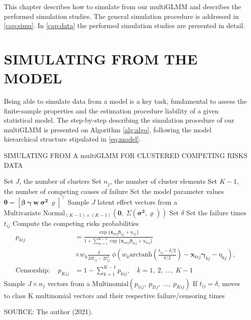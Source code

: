 This chapter describes how to simulate from our multiGLMM and describes
the performed simulation studies. The general simulation procedure is
addressed in \autoref{cap:simu}. In \autoref{cap:data} the performed
simulation studies are presented in detail.

\section{SIMULATING FROM THE MODEL}
\label{cap:simu}

Being able to simulate data from a model is a key task, fundamental to
assess the finite-sample properties and the estimation procedure
liability of a given statistical model. The step-by-step describing the
simulation procedure of our multiGLMM is presented on Algorithm
\autoref{alg:algo}, following the model hierarchical structure
stipulated in \autoref{eq:model}.

\begin{algorithm}[H]
 \caption{SIMULATING FROM A \(\text{multiGLMM}\) FOR CLUSTERED COMPETING
          RISKS DATA}
 \label{alg:algo}
 \begin{algorithmic}[1]
  \State
   Set \(J\), the number of clusters
  \State
   Set \(n_{j}\), the number of cluster elements
  \State
   Set \(K-1\), the number of competing causes of failure
  \State
   Set the model parameter values \(\bm{\theta} =
   [\bm{\beta}~\bm{\gamma}~\bm{w}~\bm{\sigma^{2}}~\bm{\varrho}]^{\top}\)
  \State
   Sample \(J\) latent effect vectors from a
   \(\text{Multivariate Normal}_{(K-1)\times(K-1)}(
      \bm{0},~\Sigma(\bm{\sigma^{2},\varrho})
     )\)
  \State
   Set \(\delta\)
  \State
   Set the failure times \(t_{ij}\)
  \State
   Compute the competing risks probabilities
   \begin{align*}
    p_{kij} &=
    \frac{\exp\{\bm{x}_{kij}\bm{\beta}_{kj} + u_{kj}\}}{
          1 +
          \sum_{m=1}^{K-1}\exp\{\bm{x}_{mij}\bm{\beta}_{mj} + u_{mj}\}
         }\\
    &\times w_{k}\frac{\delta}{2\delta t_{ij} - 2t_{ij}^{2}}~
     \phi\left(w_{k}
      \text{arctanh}\left(\frac{t_{ij}-\delta/2}{\delta/2}\right) -
      \bm{x}_{kij}\bm{\gamma}_{kj} - \eta_{kj}
     \right),\\
    \text{Censorship}: \quad
    p_{Kij} &=
    1 - \sum_{k=1}^{K-1} p_{kij}, \quad k = 1,~2,~\dots,~K-1
   \end{align*}
  \State
   Sample \(J\times n_{j}\) vectors from a
   \(\text{Multinomial}(p_{1ij},~p_{2ij},~\dots,~p_{Kij})\)
  \State
   If \(t_{ij} = \delta\), moves to class K
  \State
   \Return
    multinomial vectors and their respective failure/censoring times
 \end{algorithmic}
\end{algorithm}
\vspace{-1cm}
\begin{footnotesize}
  \begin{center}
    SOURCE: The author (2021).
  \end{center}
\end{footnotesize}

